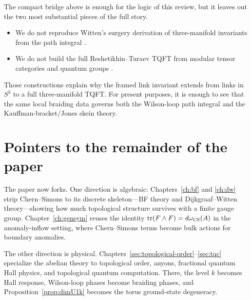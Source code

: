 \begin{remark}\label{rem:witten-jones-skipped}
The compact bridge above is enough for the logic of this review, but it leaves out the two most substantial pieces of the full story.
\begin{itemize}
\item We do not reproduce Witten's surgery derivation of three-manifold invariants from the path integral \cite{Witten1989Jones}.
\item We do not build the full Reshetikhin--Turaev TQFT from modular tensor categories and quantum groups \cite{ReshetikhinTuraev1991,Turaev2016QuantumInvariants}.
\end{itemize}
Those constructions explain why the framed link invariant extends from links in $S^3$ to a full three-manifold TQFT. For present purposes, it is enough to see that the same local braiding data governs both the Wilson-loop path integral and the Kauffman-bracket/Jones skein theory.
\end{remark}

\section{Pointers to the remainder of the paper}

The paper now forks.  One direction is algebraic: Chapters~\ref{ch:bf} and \ref{ch:dw} strip Chern--Simons to its discrete skeleton---BF theory and Dijkgraaf--Witten theory---showing how much topological structure survives with a finite gauge group.  Chapter~\ref{ch:gensym} reuses the identity $\operatorname{tr}(F\wedge F)=d\omega_{\operatorname{CS}}(A)$ in the anomaly-inflow setting, where Chern--Simons terms become bulk actions for boundary anomalies.

\medskip

\noindent The other direction is physical.  Chapters~\ref{sec:topological-order}--\ref{sec:tqc} specialize the abelian theory to topological order, anyons, fractional quantum Hall physics, and topological quantum computation.  There, the level $k$ becomes Hall response, Wilson-loop phases become braiding phases, and Proposition~\ref{prop:dimU1k} becomes the torus ground-state degeneracy.

